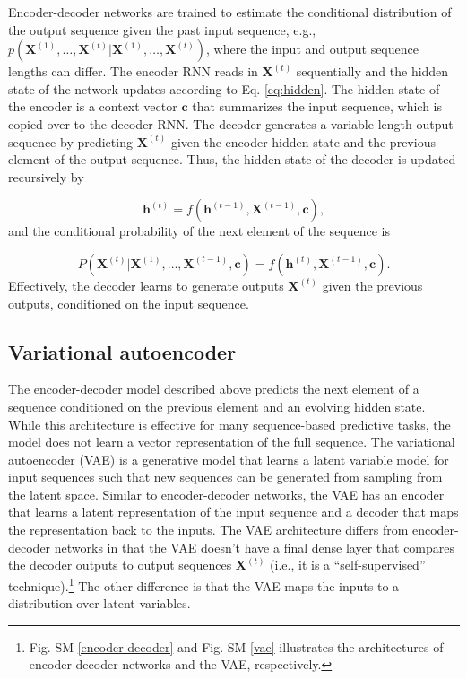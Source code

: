 \documentclass[hidelinks,12pt]{article}
\begin{document}
Encoder-decoder networks are trained to estimate the conditional distribution of the output sequence given the past input sequence, e.g., $p (\mathbf{X}^{(1)}, \ldots, \mathbf{X}^{(t)} | \mathbf{X}^{(1)}, \ldots, \mathbf{X}^{(t)})$, where the input and output sequence lengths can differ. The encoder RNN reads in $\mathbf{X}^{(t)}$ sequentially and the hidden state of the network updates according to Eq. \ref{eq:hidden}. The hidden state of the encoder is a context vector $\mathbf{c}$ that summarizes the input sequence, which is copied over to the decoder RNN. The decoder generates a variable-length output sequence by predicting $\mathbf{X}^{(t)}$ given the encoder hidden state and the previous element of the output sequence. Thus, the hidden state of the decoder is updated recursively by

\begin{equation}
\mathbf{h}^{(t)} = f \left( \mathbf{h}^{(t-1)}, \mathbf{X}^{(t-1)}, \mathbf{c} \right), \label{eq:decoder}
\end{equation} and the conditional probability of the next element of the sequence is 

\begin{equation}
P (\mathbf{X}^{(t)} | \mathbf{X}^{(1)}, \ldots, \mathbf{X}^{(t-1)}, \mathbf{c}) =  f \left( \mathbf{h}^{(t)}, \mathbf{X}^{(t-1)}, \mathbf{c} \right).
\end{equation}  Effectively, the decoder learns to generate outputs $\mathbf{X}^{(t)}$ given the previous outputs, conditioned on the input sequence. 

\subsection{Variational autoencoder}

The encoder-decoder model described above predicts the next element of a sequence conditioned on the previous element and an evolving hidden state. While this architecture is effective for many sequence-based predictive tasks, the model does not learn a vector representation of the full sequence. The variational autoencoder (VAE) \citep{kingma2013auto} is a generative model that learns a latent variable model for input sequences such that new sequences can be generated from sampling from the latent space. Similar to encoder-decoder networks, the VAE has an encoder that learns a latent representation of the input sequence and a decoder that maps the representation back to the inputs. The VAE architecture differs from encoder-decoder networks in that the VAE doesn't have a final dense layer that compares the decoder outputs to output sequences $\mathbf{X}^{(t)}$ (i.e., it is a ``self-supervised'' technique).\footnote{Fig. SM-\ref{encoder-decoder} and Fig. SM-\ref{vae} illustrates the architectures of encoder-decoder networks and the VAE, respectively.} The other difference is that the VAE maps the inputs to a distribution over latent variables. 
\end{document}
